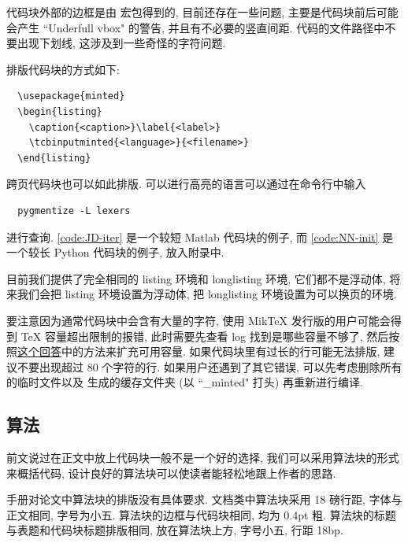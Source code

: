 代码块外部的边框是由  宏包得到的, 目前还存在一些问题, 主要是代码块前后可能会产生 ``Underfull vbox" 的警告, 并且有不必要的竖直间距. 代码的文件路径中不要出现下划线, 这涉及到一些奇怪的字符问题.

排版代码块的方式如下:
\begin{verbatim}
  \usepackage{minted}
  \begin{listing}
    \caption{<caption>}\label{<label>}
    \tcbinputminted{<language>}{<filename>}
  \end{listing}
\end{verbatim}
跨页代码块也可以如此排版. 可以进行高亮的语言可以通过在命令行中输入
\begin{verbatim}
  pygmentize -L lexers
\end{verbatim}
进行查询. \ref{code:JD-iter} 是一个较短 Matlab 代码块的例子, 而 \ref{code:NN-init} 是一个较长 Python 代码块的例子, 放入附录中.

目前我们提供了完全相同的 listing 环境和 longlisting 环境, 它们都不是浮动体, 将来我们会把 listing 环境设置为浮动体, 把 longlisting 环境设置为可以换页的环境.

要注意因为通常代码块中会含有大量的字符, 使用 MikTeX 发行版的用户可能会得到 TeX 容量超出限制的报错, 此时需要先查看 log 找到是哪些容量不够了, 然后按照\href{https://tex.stackexchange.com/a/548335/}{这个回答}中的方法来扩充可用容量. 如果代码块里有过长的行可能无法排版, 建议不要出现超过 80 个字符的行. 如果用户还遇到了其它错误, 可以先考虑删除所有的临时文件以及  生成的缓存文件夹 (以 ``\_minted" 打头) 再重新进行编译.


\subsection{算法}

前文说过在正文中放上代码块一般不是一个好的选择, 我们可以采用算法块的形式来概括代码, 设计良好的算法块可以使读者能轻松地跟上作者的思路.

手册对论文中算法块的排版没有具体要求. 文档类中算法块采用 18 磅行距, 字体与正文相同, 字号为小五. 算法块的边框与代码块相同, 均为 0.4pt 粗. 算法块的标题与表题和代码块标题排版相同, 放在算法块上方, 字号小五, 行距 18bp.

